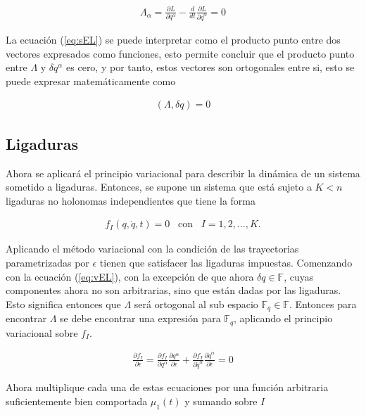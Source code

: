 \begin{gather}
    \label{eq:vEL}\Lambda_\alpha =  \frac{\partial L}{\partial q^{\alpha}}- \frac{d}{dt}\frac{\partial L}{\partial \dot{q}^{\alpha}} = 0
\end{gather}

La ecuación (\ref*{eq:sEL}) se puede interpretar como el producto punto entre dos vectores expresados como funciones, esto permite concluir que el producto punto entre $\Lambda$ y $\delta q^{\alpha}$ es cero, y por tanto, estos vectores son ortogonales entre si, esto se puede expresar matemáticamente como

\begin{gather}
    \left(\Lambda, \delta q \right) = 0
\end{gather}



\subsection[short]{Ligaduras}

Ahora se aplicará el principio variacional para describir la dinámica de un sistema sometido a ligaduras. Entonces, se supone un sistema que está sujeto a $K < n$ ligaduras no holonomas independientes que tiene la forma

\begin{gather}
    \label{eq:Lig}f_I(q,\dot{q},t) = 0 \;\;\; \text{con} \;\;\; I = 1,2,\dots, K.
\end{gather}

Aplicando el método variacional con la condición de las trayectorias parametrizadas por $\epsilon$ tienen que satisfacer las ligaduras impuestas. Comenzando con la ecuación (\ref*{eq:vEL}), con la excepción de que ahora $\delta q \in \mathbb{F}$, cuyas componentes ahora no son arbitrarias, sino que están dadas por las ligaduras. Esto significa entonces que $\Lambda$ será ortogonal al sub espacio  $\mathbb{F}_q \in \mathbb{F}$. Entonces para encontrar $\Lambda$ se debe encontrar una expresión para $\mathbb{F}_q$, aplicando el principio variacional sobre $f_I$.

\begin{gather*}
    \frac{\partial f_I}{\partial \epsilon} = \frac{\partial f_I}{\partial q^{\alpha}}\frac{\partial q^{\alpha}}{\partial \epsilon} + \frac{\partial f_I}{\partial \dot{q}^{\alpha}}\frac{\partial \dot{q}^{\alpha}}{\partial \epsilon} = 0
\end{gather*}

Ahora multiplique cada una de estas ecuaciones por una función arbitraria suficientemente bien comportada $\mu_1(t)$ y sumando sobre $I$

